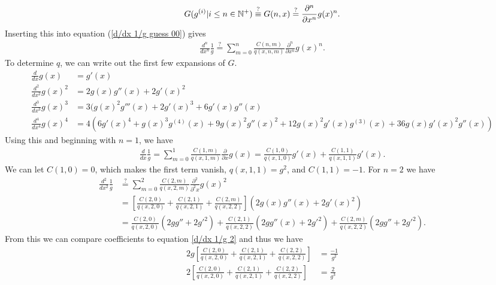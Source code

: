 \begin{align}
	G( g^{(i)}|i \leq n \in {\mathbb N}^+) \overset{?}{\equiv} G(n, x) \overset{?}{=} \frac{\partial^n}{\partial x^n}g(x)^n.
\end{align}
Inserting this into equation (\ref{d/dx 1/g guess 00}) gives
\begin{align}
	\frac{d^n}{dx^n}\frac{1}{g} \overset{?}{=} \sum_{m=0}^{n}\frac{C(n,m)}{q(x, n, m)}\frac{\partial^n}{\partial x^n}g(x)^n \label{d/dx 1/g guess 01}.
\end{align}
To determine $q$, we can write out the first few expansions of $G$.
\begin{align}
	\frac{d}{dx} g(x) &= g'(x) \label{d/dx g}\\
	\frac{d^2}{dx^2} g(x)^2 &=  2g(x)g''(x)+2g'(x)^2 \label{d^2/dx^2 g^2}\\
	\frac{d^3}{dx^3} g(x)^3 &= 3(g(x)^2g'''(x)+2g'(x)^3 +6g'(x)g''(x) \label{d^3/dx^3 g^3}\\
	\frac{d^4}{dx^4} g(x)^4 &= 4(6g'(x)^4+g(x)^3g^{(4)}(x)+9g(x)^2g''(x)^2+ 12g(x)^2g'(x)g^{(3)}(x)+36g(x)g'(x)^2g''(x)) \label{d^4/dx^4 g^4}
\end{align}
Using this and beginning with $n=1$, we have
\begin{align}
		\frac{d}{dx}\frac{1}{g} = \sum_{m=0}^{1}\frac{C(1,m)}{q(x, 1, m)}\frac{\partial}{\partial x}g(x) = \frac{C(1,0)}{q(x, 1, 0)}g'(x) + \frac{C(1,1)}{q(x, 1, 1)}g'(x).
\end{align}
We can let $C(1,0)=0$, which makes the first term vanish, $q(x,1,1) = g^{2}$, and $C(1,1) = -1$. For $n=2$ we have
\begin{align}
	\frac{d^2}{dx^2}\frac{1}{g} &\overset{?}{=} \sum_{m=0}^{2}\frac{C(2,m)}{q(x, 2, m)}\frac{\partial^2}{\partial^2 x}g(x)^2 \\ 
	&= \left[\frac{C(2,0)}{q(x, 2, 0)} + \frac{C(2,1)}{q(x, 2, 1)} + \frac{C(2,m)}{q(x, 2, 2)}\right]\left(2g(x)g''(x)+2g'(x)^2\right) \\
	&= \frac{C(2,0)}{q(x, 2, 0)}\left(2gg''+2g'^2\right) + \frac{C(2,1)}{q(x, 2, 2)}\left(2gg''(x)+2g'^2\right) + \frac{C(2,m)}{q(x, 2, 2)}\left(2gg''+2g'^2\right).
\end{align}
From this we can compare coefficients to equation \ref{d/dx 1/g 2} and thus we have
\begin{align}
	2g\left[\frac{C(2,0)}{q(x, 2, 0)}+ \frac{C(2,1)}{q(x, 2, 1)} + \frac{C(2,2)}{q(x, 2, 2)}\right] &= \frac{-1}{g^2} \\	
	2\left[\frac{C(2,0)}{q(x, 2, 0)}+ \frac{C(2,1)}{q(x, 2, 1)} + \frac{C(2,2)}{q(x, 2, 2)}\right] &= \frac{2}{g^3}
\end{align}
